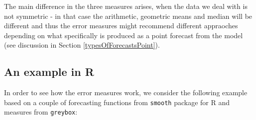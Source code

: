 \documentclass[
]{book}
\newenvironment{Shaded}{\begin{snugshade}}{\end{snugshade}}
\newcommand{\AttributeTok}[1]{\textcolor[rgb]{0.77,0.63,0.00}{#1}}
\newcommand{\CommentTok}[1]{\textcolor[rgb]{0.56,0.35,0.01}{\textit{#1}}}
\newcommand{\ConstantTok}[1]{\textcolor[rgb]{0.00,0.00,0.00}{#1}}
\newcommand{\DecValTok}[1]{\textcolor[rgb]{0.00,0.00,0.81}{#1}}
\newcommand{\FunctionTok}[1]{\textcolor[rgb]{0.00,0.00,0.00}{#1}}
\newcommand{\NormalTok}[1]{#1}
\newcommand{\OtherTok}[1]{\textcolor[rgb]{0.56,0.35,0.01}{#1}}
\newcommand{\SpecialCharTok}[1]{\textcolor[rgb]{0.00,0.00,0.00}{#1}}
\newcommand{\StringTok}[1]{\textcolor[rgb]{0.31,0.60,0.02}{#1}}
\theoremstyle{definition}
\theoremstyle{definition}
\theoremstyle{definition}
\theoremstyle{definition}
\theoremstyle{remark}
\begin{document}
The main difference in the three measures arises, when the data we deal with is not symmetric - in that case the arithmetic, geometric means and median will be different and thus the error measures might recommend different appraoches depending on what specifically is produced as a point forecast from the model (see discussion in Section \ref{typesOfForecastsPoint}).

\hypertarget{an-example-in-r}{%
\subsection{An example in R}\label{an-example-in-r}}

In order to see how the error measures work, we consider the following example based on a couple of forecasting functions from \texttt{smooth} package for R \citep[ and \citet{Svetunkov2015}]{Hyndman2008b} and measures from \texttt{greybox}:

\begin{Shaded}
\end{Shaded}
\end{document}
